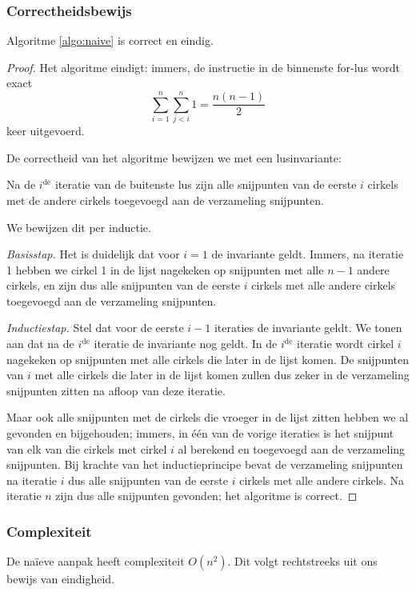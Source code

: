 \subsubsection{Correctheidsbewijs}
\begin{stl} Algoritme \ref{algo:naive} is correct en eindig.\end{stl}
\begin{proof}
Het algoritme eindigt: immers, de instructie in de binnenste for-lus
wordt exact \[\sum_{i=1}^{n} \sum_{j<i}^{n} 1 = \frac{n(n-1)}{2} \]
keer uitgevoerd. 

De correctheid van het algoritme bewijzen we met een lusinvariante:
\begin{inv} 
Na de $i^{\textrm{de}}$ iteratie van de buitenste lus zijn
alle snijpunten van de eerste $i$ cirkels met de andere cirkels
toegevoegd aan de verzameling snijpunten.
\end{inv} 

We bewijzen dit per inductie.

\textit{Basisstap.} Het is duidelijk dat voor $i = 1$ de invariante
geldt. Immers, na iteratie 1 hebben we cirkel 1 in de lijst nagekeken
op snijpunten met alle $n-1$ andere cirkels, en zijn dus alle
snijpunten van de eerste $i$ cirkels met alle andere cirkels
toegevoegd aan de verzameling snijpunten.

\textit{Inductiestap.} Stel dat voor de eerste $i - 1$ iteraties de
invariante geldt. We tonen aan dat na de $i^{\textrm{de}}$
iteratie de invariante nog geldt. In de $i^{\textrm{de}}$ iteratie
wordt cirkel $i$ nagekeken op snijpunten met alle cirkels die later in
de lijst komen. De snijpunten van $i$ met alle cirkels die later in de
lijst komen zullen dus zeker in de verzameling snijpunten zitten na
afloop van deze iteratie. 

Maar ook alle snijpunten met de cirkels die vroeger in de lijst zitten
hebben we al gevonden en bijgehouden; immers, in \'e\'en van de vorige
iteraties is het snijpunt van elk van die cirkels met cirkel $i$ al
berekend en toegevoegd aan de verzameling snijpunten. Bij krachte van
het inductieprincipe bevat de verzameling snijpunten na iteratie $i$
dus alle snijpunten van de eerste $i$ cirkels met alle andere
cirkels. Na iteratie $n$ zijn dus alle snijpunten gevonden; het
algoritme is correct.
\end{proof}

\subsubsection{Complexiteit}
De na\"ieve aanpak heeft complexiteit $O(n^2)$. Dit volgt rechtstreeks uit ons bewijs van eindigheid.

